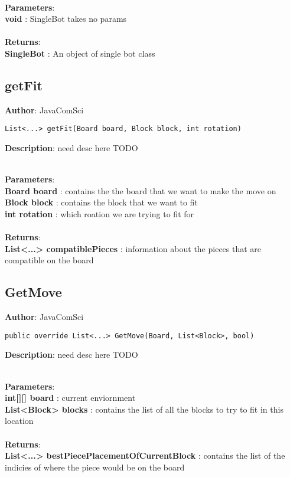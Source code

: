 \documentclass[12pt]{article}
\begin{document}
\textbf{\large{\\Parameters}}:\\
\textbf{void }: SingleBot takes no params\\\textbf{\large{\\Returns}}:\\\textbf{SingleBot }: An object of single bot class

\subsection{getFit}
\textbf{Author}: JavaComSci 
\vspace*{1\baselineskip}
\begin{lstlisting}
List<...> getFit(Board board, Block block, int rotation)
\end{lstlisting} 
\vspace*{1\baselineskip}
\textbf{Description}: need desc here TODO 


\textbf{\large{\\Parameters}}:\\
\textbf{Board board }: contains the the board that we want to make the move on\\
\textbf{Block block }: contains the block that we want to fit\\
\textbf{int rotation }: which roation we are trying to fit for\\\textbf{\large{\\Returns}}:\\\textbf{List<...> compatiblePieces }: information about the pieces that are compatible on the board

\subsection{GetMove}
\textbf{Author}: JavaComSci 
\vspace*{1\baselineskip}
\begin{lstlisting}
public override List<...> GetMove(Board, List<Block>, bool)
\end{lstlisting} 
\vspace*{1\baselineskip}
\textbf{Description}: need desc here TODO 


\textbf{\large{\\Parameters}}:\\
\textbf{int[][] board }: current enviornment\\
\textbf{List<Block> blocks }: contains the list of all the blocks to try to fit in this location\\\textbf{\large{\\Returns}}:\\\textbf{List<...> bestPiecePlacementOfCurrentBlock }: contains the list of the indicies of where the piece would be on the board
\end{document}
